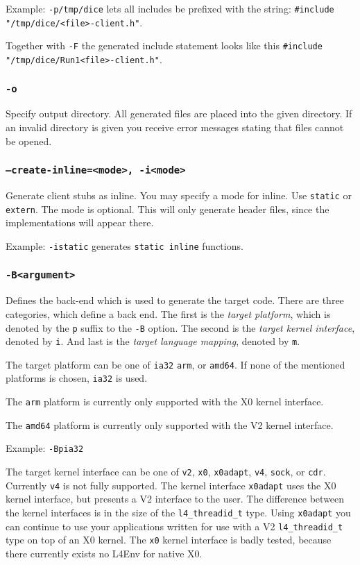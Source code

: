 Example: \verb|-p/tmp/dice| lets all includes be prefixed with
the string: \verb|#include "/tmp/dice/<file>-client.h"|.

Together with \verb|-F| the generated include statement looks like this
\verb|#include "/tmp/dice/Run1<file>-client.h"|.

\subsubsection{{\tt -o}}
Specify output directory. All generated files are placed into the 
given directory. If an invalid directory is given you receive error
messages stating that files cannot be opened.

\subsubsection{{\tt --create-inline=<mode>, -i<mode>}}
Generate client stubs as inline. You may specify a mode for
inline. Use \verb|static| or \verb|extern|. The mode is optional.
This will only generate header files, since the implementations
will appear there.

Example: \verb|-istatic| generates \verb|static inline| functions.

\subsubsection{{\tt -B<argument>}}

Defines the back-end which is used to generate the target code. There are
three categories, which define a back end. The first is the {\it target
platform}, which is denoted by the {\tt p} suffix to the {\tt -B} option.  The
second is the {\it target kernel interface}, denoted by {\tt i}. And last is
the {\it target language mapping}, denoted by {\tt m}.

The target platform can be one of {\tt ia32} {\tt arm}, or {\tt amd64}.  If
none of the mentioned platforms is chosen, {\tt ia32} is used.

The {\tt arm} platform is currently only supported with the X0 kernel
interface.

The {\tt amd64} platform is currently only supported with the V2 kernel
interface.

Example: \verb|-Bpia32|

The target kernel interface can be one of {\tt v2}, {\tt x0}, {\tt x0adapt},
{\tt v4}, {\tt sock}, or {\tt cdr}. Currently {\tt v4} is not fully supported.
The kernel interface {\tt x0adapt} uses the X0 kernel interface, but presents
a V2 interface to the user. The difference between the kernel interfaces is in
the size of the \verb|l4_threadid_t| type. Using {\tt x0adapt} you can
continue to use your applications written for use with a V2
\verb|l4_threadid_t| type on top of an X0 kernel.  The {\tt x0} kernel
interface is badly tested, because there currently exists no L4Env for native
X0.

